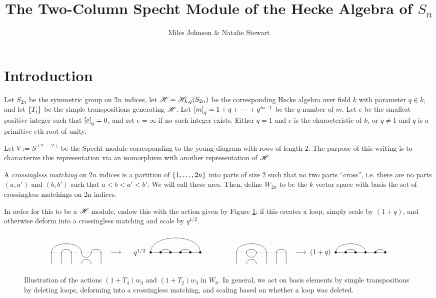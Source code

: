 \documentclass{amsart}
\begin{document}
\title{The Two-Column Specht Module of the Hecke Algebra of $S_n$}
\author{Miles Johnson \& Natalie Stewart}
\maketitle

\section{Introduction}
Let $S_{2n}$ be the symmetric group on $2n$ indices, let $\mathscr{H} = \mathscr{H}_{k,q}(S_{2n})$ be the corresponding Hecke algebra over field $k$ with parameter $q \in k$, and let $\left\{ T_i \right\}$ be the simple transpositions generating $\mathscr{H}$.
Let $\left[ m \right]_q = 1 + q + \dots + q^{m-1}$ be the $q$-number of $m$. 
Let $e$ be the smallest positive integer such that $\left[ e \right]_q = 0$, and set $e = \infty$ if no such integer exists.
Either $q = 1$ and $e$ is the characteristic of $k$, or $q \neq 1$ and $q$ is a primitive $e$th root of unity.

Let $V := S^{(2,\dots,2)}$ be the Specht module corresponding to the young diagram with rows of length 2.
The purpose of this writing is to characterize this representation via an isomorphism with another representation of $\mathscr{H}$.
\begin{definition}
  A \emph{crossingless matching} on $2n$ indices is a partition of $\left\{ 1,\dots,2n \right\}$ into parts of size $2$ such that no two parts ``cross'', i.e. there are no parts $(a,a')$ and $(b,b')$ such that $a < b < a' < b'$.
  We will call these arcs.
  Then, define $W_{2n}$ to be the $k$-vector space with basis the set of crossingless matchings on 2n indices.

  In order for this to be a $\mathscr{H}$-module, endow this with the action given by Figure \ref{Action}; if this creates a loop, simply scale by $(1 + q)$, and otherwise deform into a crossingless matching and scale by $q^{1/2}$.
\end{definition}

\begin{figure}
  \[
    \Action{6}{1/4, 2/3, 5/6}{4}{1/6, 2/3, 4/5}{q^{1/2}}
    \hspace{50pt}
    \Action{6}{1/4, 2/3, 5/6}{2}{1/4, 2/3, 5/6}{(1 + q)}
  \]
  \caption{Illustration of the actions $(1 + T_4)w_3$ and $(1 + T_2)w_3$ in $W_6$.
  In general, we act on basis elements by simple transpositions by deleting loops, deforming into a crossingless matching, and scaling based on whether a loop was deleted.}
  \label{Action}
\end{figure}
\end{document}

